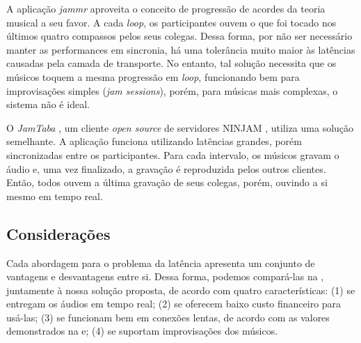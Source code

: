 A aplicação \textit{jammr} \cite{jammr} aproveita o conceito de progressão de acordes da teoria musical a seu favor. A cada \textit{loop}, os participantes ouvem o que foi tocado nos últimos quatro compassos pelos seus colegas. Dessa forma, por não ser necessário manter as performances em sincronia, há uma tolerância muito maior às latências causadas pela camada de transporte. No entanto, tal solução necessita que os músicos toquem a mesma progressão em \textit{loop}, funcionando bem para improvisações simples (\textit{jam sessions}), porém, para músicas mais complexas, o sistema não é ideal.

O \textit{JamTaba} \cite{jamtaba}, um cliente \textit{open source} de servidores NINJAM \cite{ninjam}, utiliza uma solução semelhante. A aplicação funciona utilizando latências grandes, porém sincronizadas entre os participantes. Para cada intervalo, os músicos gravam o áudio e, uma vez finalizado, a gravação é reproduzida pelos outros clientes. Então, todos ouvem a última gravação de seus colegas, porém, ouvindo a si mesmo em tempo real.

\subsection{Considerações}

Cada abordagem para o problema da latência apresenta um conjunto de vantagens e desvantagens entre si. Dessa forma, podemos compará-las na , juntamente à nossa solução proposta, de acordo com quatro características: (1) se entregam os áudios em tempo real; (2) se oferecem baixo custo financeiro para usá-las; (3) se funcionam bem em conexões lentas, de acordo com as valores demonstrados na  e; (4) se suportam improvisações dos músicos. 

\renewcommand{\arraystretch}{2}

